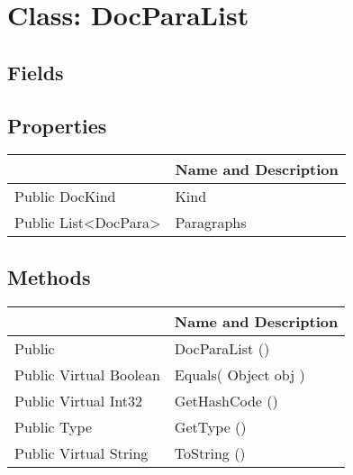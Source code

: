 \documentclass[11pt, oneside, a4paper]{book}
\begin{document}
\hypertarget{SoftwareEngineeringTools.{}Documentation.{}DocParaList}{}
\section{Class: DocParaList}

\subsection{Fields}

\subsection{Properties}
\begin{center}
\begin{tabular}{| p{3cm} | p{12cm} | }
\hline
\textbf{ } & \textbf{ Name and Description}\\
\hline
 Public  DocKind &  Kind\hypertarget{SoftwareEngineeringTools.{}Documentation.{}DocParaList.{}Kind}{}\\
\hline
 Public  List<DocPara> &  Paragraphs\hypertarget{SoftwareEngineeringTools.{}Documentation.{}DocParaList.{}Paragraphs}{}\\
\hline
\end{tabular}
\end{center}

\subsection{Methods}
\begin{center}
\begin{tabular}{| p{3cm} | p{12cm} | }
\hline
\textbf{ } & \textbf{ Name and Description}\\
\hline
 Public  &  DocParaList ()\hypertarget{SoftwareEngineeringTools.{}Documentation.{}DocParaList.{}DocParaList}{}\\
\hline
 Public  Virtual  Boolean &  Equals(\hypertarget{SoftwareEngineeringTools.{}Documentation.{}DocParaList.{}Equals\_Object}{} Object  obj  )\\
\hline
 Public  Virtual  Int32 &  GetHashCode ()\hypertarget{SoftwareEngineeringTools.{}Documentation.{}DocParaList.{}GetHashCode}{}\\
\hline
 Public  Type &  GetType ()\hypertarget{SoftwareEngineeringTools.{}Documentation.{}DocParaList.{}GetType}{}\\
\hline
 Public  Virtual  String &  ToString ()\hypertarget{SoftwareEngineeringTools.{}Documentation.{}DocParaList.{}ToString}{}\\
\hline
\end{tabular}
\end{center}
 
\end{document}
